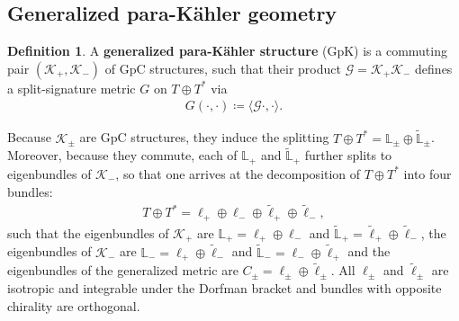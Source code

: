 \documentclass{article}
\newcommand{\TT}{{T\oplus T^*}}
\newcommand{\KK}{\mathcal{K}}
\newcommand{\GG}{\mathcal{G}}
\newcommand{\Lb}{\mathbb{L}}
\newcommand{\ellt}{{\tl{\ell}}}
\newcommand{\la}{\langle}
\newcommand{\ra}{\rangle}
\def\tl{\tilde}
\theoremstyle{definition}
\newtheorem{Def}[theorem]{Definition}
\theoremstyle{remark}
\begin{document}
\subsection{Generalized para-K\"ahler geometry}\label{sec:GpK}
\begin{Def}
A \textbf{generalized para-K\"ahler structure} (GpK) is a commuting pair $(\KK_+,\KK_-)$ of GpC structures, such that their product $\GG=\KK_+\KK_-$ defines a split-signature metric $G$ on $\TT$ via
\begin{align*}
G(\cdot,\cdot)\coloneqq \la \GG\cdot,\cdot\ra.
\end{align*}
\end{Def}

Because $\KK_\pm$ are GpC structures, they induce the splitting $\TT= \Lb_\pm\oplus\widetilde{\Lb}_\pm$. Moreover, because they commute, each of $\Lb_+$ and $\widetilde{\Lb}_+$ further splits to eigenbundles of $\KK_-$, so that one arrives at the decomposition of $\TT$ into four bundles:
\begin{align}\label{GpK_bundles}
\TT=\ell_+\oplus\ell_-\oplus \ellt_+\oplus \ellt_-,
\end{align}
such that the eigenbundles of $\KK_+$ are $\Lb_+=\ell_+\oplus\ell_-$ and $\tl{\Lb}_+=\ellt_+\oplus \ellt_-$, the eigenbundles of $\KK_-$ are $\Lb_-=\ell_+\oplus\ellt_-$ and $\tl{\Lb}_-=\ell_-\oplus \ellt_+$ and the eigenbundles of the generalized metric are $C_\pm=\ell_\pm\oplus\ellt_\pm$. All $\ell_\pm$ and $\ellt_\pm$ are isotropic and integrable under the Dorfman bracket \cite{Hu:2019zro} and bundles with opposite chirality are orthogonal.
\end{document}

